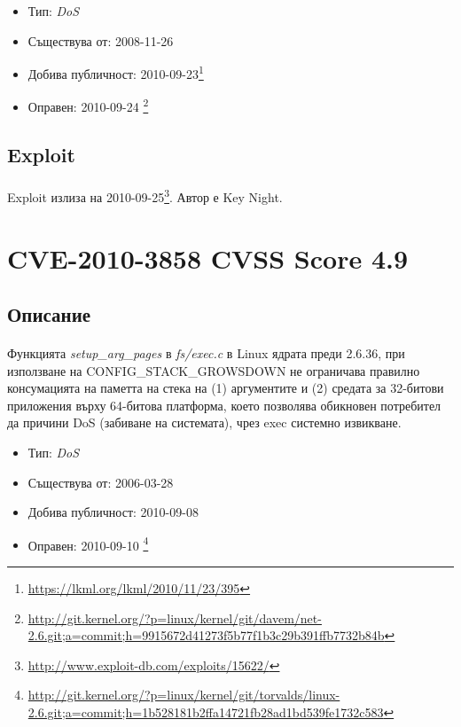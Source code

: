 \documentclass[a4paper,12pt,leqno]{article}
\begin{document}
\begin{itemize}
    \item Тип: \textit{DoS}
    \item Съществува от: 2008-11-26
  	\item Добива публичност: 2010-09-23\footnote{\url{https://lkml.org/lkml/2010/11/23/395}}
    \item Оправен: 2010-09-24 \footnote{\url{http://git.kernel.org/?p=linux/kernel/git/davem/net-2.6.git;a=commit;h=9915672d41273f5b77f1b3c29b391ffb7732b84b}}
\end{itemize}

\subsection{Exploit}
\paragraph{}
Exploit излиза на 2010-09-25\footnote{\url{http://www.exploit-db.com/exploits/15622/}}. Автор е Key Night.

\section{CVE-2010-3858 CVSS Score 4.9}
\subsection{Описание}
\paragraph{}
Функцията \textit{setup\_arg\_pages} в \textit{fs/exec.c} в Linux ядрата преди 2.6.36, при използване на CONFIG\_STACK\_GROWSDOWN не ограничава правилно консумацията на паметта на стека на (1) аргументите и (2) средата за 32-битови приложения върху 64-битова платформа, което позволява обикновен потребител да причини DoS (забиване на системата), чрез exec системно извикване.

\begin{itemize}
    \item Тип: \textit{DoS}
    \item Съществува от: 2006-03-28
  	\item Добива публичност: 2010-09-08
    \item Оправен: 2010-09-10 \footnote{\url{http://git.kernel.org/?p=linux/kernel/git/torvalds/linux-2.6.git;a=commit;h=1b528181b2ffa14721fb28ad1bd539fe1732c583}}
\end{itemize}
\end{document}
